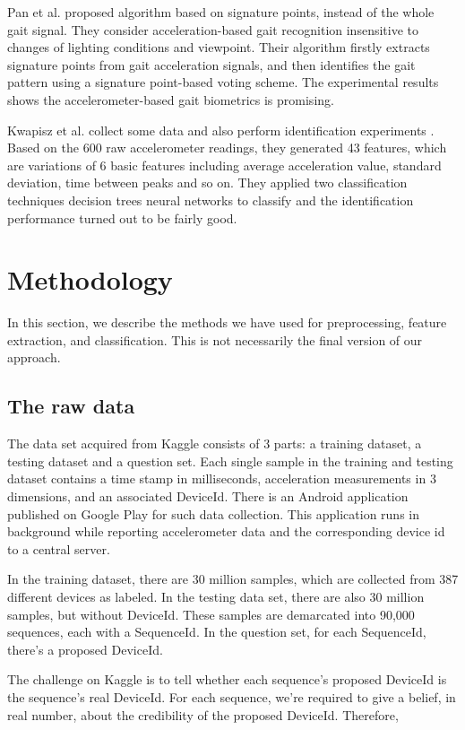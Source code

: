 \documentclass{article} %
\begin{document}
Pan et al. \cite{Pan:EL2009} proposed algorithm based on signature points, instead of the whole gait signal. They consider acceleration-based gait recognition insensitive to changes of lighting conditions and viewpoint. Their algorithm firstly extracts signature points from gait acceleration signals, and then identifies the gait pattern using a signature point-based voting scheme. The experimental results shows the accelerometer-based gait biometrics is promising. 

Kwapisz et al.\cite{Kwapisz:BTAS2009} collect some data and also perform identification experiments . Based on the 600 raw accelerometer readings, they generated 43 features, which are variations of 6 basic features including average acceleration value, standard deviation, time between peaks and so on. They applied two classification techniques decision trees neural networks to classify and the identification performance turned out to be fairly good.



\section{Methodology}
In this section, we describe the methods we have used for preprocessing, feature extraction, and classification. This is not necessarily the final version of our approach. 

\subsection{The raw data}
The data set acquired from Kaggle consists of 3 parts: a training dataset, a testing dataset and a question set. Each single sample in the training and testing dataset contains a time stamp in milliseconds, acceleration measurements in 3 dimensions, and an associated DeviceId.  There is an Android application published on Google Play for such data collection. This application runs in background while reporting accelerometer data and the corresponding device id to a central server. 

In the training dataset, there are 30 million samples, which are collected from 387 different devices as labeled. In the testing data set, there are also 30 million samples, but without DeviceId. These samples are demarcated into 90,000 sequences, each with a SequenceId. In the question set, for each SequenceId, there's a proposed DeviceId.

The challenge on Kaggle is to tell whether each sequence's proposed DeviceId is the sequence's real DeviceId. For each sequence, we're required to give a belief, in real number, about the credibility of the proposed DeviceId. Therefore, 
\end{document}
